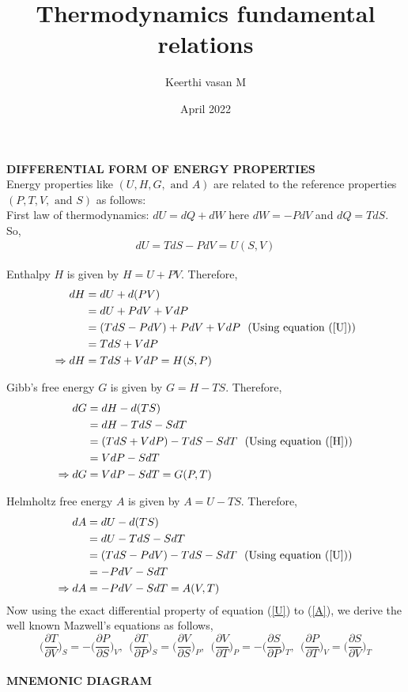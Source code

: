 \documentclass{article}
\title{Thermodynamics fundamental relations}
\author{Keerthi vasan M}
\date{April 2022}
\begin{document}
\noindent \textbf{\Large DIFFERENTIAL FORM OF ENERGY PROPERTIES}\\[0.4cm]
Energy properties like $(U,H,G,\text{ and }A)$ are related to the reference properties $(P,T,V,\text{ and }S)$ as follows:\\[0.2 cm]
First law of thermodynamics: $dU = dQ + dW$ here $dW = -PdV$ and $dQ=TdS$. So,
\begin{equation} \label{U}
\begin{split}
    dU=TdS-PdV=U(S,V)
\end{split}
\end{equation}
 
\noindent Enthalpy $H$ is given by $H=U+PV$. Therefore,
\begin{equation} \label{H}
\begin{split}
    dH&=dU+d(PV) \\
    &=dU+PdV+VdP\\
    &=(TdS-PdV)+PdV+VdP \text{\ \ (Using equation (\ref{U}))}\\
    &=TdS+VdP\\
    \Rightarrow dH&=TdS+VdP=H(S,P)
\end{split}
\end{equation}
    
\noindent Gibb's free energy $G$ is given by $G=H-TS$. Therefore,  
\begin{equation} \label{G}
\begin{split}
    dG&=dH-d(TS) \\
    &=dH-TdS-SdT\\
    &=(TdS+VdP)-TdS-SdT \text{\ \ (Using equation (\ref{H}))}\\
    &=VdP-SdT\\
    \Rightarrow dG&=VdP-SdT=G(P,T)
\end{split}
\end{equation} 
    
\noindent Helmholtz free energy $A$ is given by $A=U-TS$. Therefore,  
\begin{equation} \label{A}
\begin{split}
    dA&=dU-d(TS) \\
    &=dU-TdS-SdT\\
    &=(TdS-PdV)-TdS-SdT \text{\ \ (Using equation (\ref{U}))}\\
    &=-PdV-SdT\\
    \Rightarrow dA&=-PdV-SdT=A(V,T)
\end{split}
\end{equation}
Now using the exact differential property of equation (\ref{U}) to (\ref{A}), we derive the well known Mazwell's equations as follows,
\begin{equation}
    \bigg(\frac{\partial T}{\partial V}\bigg)_S = -\bigg(\frac{\partial P}{\partial S}\bigg)_V,\ \  \bigg(\frac{\partial T}{\partial P}\bigg)_S = \bigg(\frac{\partial V}{\partial S}\bigg)_P ,\ \  \bigg(\frac{\partial V}{\partial T}\bigg)_P = -\bigg(\frac{\partial S}{\partial P}\bigg)_T,\ \  \bigg(\frac{\partial P}{\partial T}\bigg)_V = \bigg(\frac{\partial S}{\partial V}\bigg)_T
\end{equation}\\
\textbf{\Large MNEMONIC DIAGRAM}\\[0.4cm]
\end{document}
